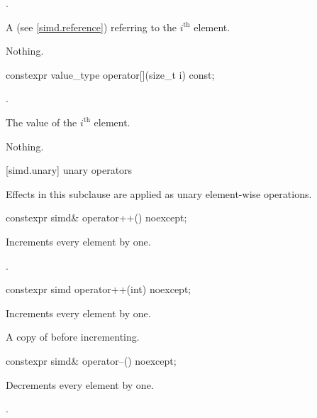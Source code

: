 \begin{itemdescr}
  \pnum\requires
  .

  \pnum\returns
  A  (see \ref{simd.reference}) referring to the $i^\text{th}$ element.

  \pnum\throws Nothing.
\end{itemdescr}

\begin{itemdecl}
constexpr value_type operator[](size_t i) const;
\end{itemdecl}

\begin{itemdescr}
  \pnum\requires
  .

  \pnum\returns
  The value of the $i^\text{th}$ element.

  \pnum\throws Nothing.
\end{itemdescr}

[simd.unary]{ unary operators}

\pnum
Effects in this subclause are applied as unary element-wise operations.

\begin{itemdecl}
constexpr simd& operator++() noexcept;
\end{itemdecl}

\begin{itemdescr}
  \pnum\effects
  Increments every element by one.

  \pnum\returns
  .
\end{itemdescr}

\begin{itemdecl}
constexpr simd operator++(int) noexcept;
\end{itemdecl}

\begin{itemdescr}
  \pnum\effects
  Increments every element by one.

  \pnum\returns
  A copy of  before incrementing.
\end{itemdescr}

\begin{itemdecl}
constexpr simd& operator--() noexcept;
\end{itemdecl}

\begin{itemdescr}
  \pnum\effects
  Decrements every element by one.

  \pnum\returns
  .
\end{itemdescr}

